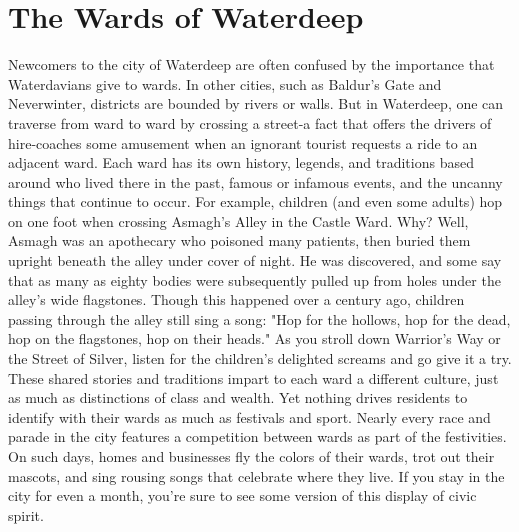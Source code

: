 \documentclass[10pt,a4paper,twoside,twocolumn,openany,nodeprecatedcode]{dndbook}
\begin{document}
\section{The Wards of Waterdeep}
Newcomers to the city of Waterdeep are often confused by the importance that Waterdavians give to wards. In other cities, such as Baldur's Gate and Neverwinter, districts are bounded by rivers or walls. But in Waterdeep, one can traverse from ward to ward by crossing a street-a fact that offers the drivers of hire-coaches some amusement when an ignorant tourist requests a ride to an adjacent ward.
Each ward has its own history, legends, and traditions based around who lived there in the past, famous or infamous events, and the uncanny things that continue to occur. For example, children (and even some adults) hop on one foot when crossing Asmagh's Alley in the Castle Ward. Why? Well, Asmagh was an apothecary who poisoned many patients, then buried them upright beneath the alley under cover of night. He was discovered, and some say that as many as eighty bodies were subsequently pulled up from holes under the alley's wide flagstones. Though this happened over a century ago, children passing through the alley still sing a song: "Hop for the hollows, hop for the dead, hop on the flagstones, hop on their heads." As you stroll down Warrior's Way or the Street of Silver, listen for the children's delighted screams and go give it a try.
These shared stories and traditions impart to each ward a different culture, just as much as distinctions of class and wealth. Yet nothing drives residents to identify with their wards as much as festivals and sport. Nearly every race and parade in the city features a competition between wards as part of the festivities. On such days, homes and businesses fly the colors of their wards, trot out their mascots, and sing rousing songs that celebrate where they live. If you stay in the city for even a month, you're sure to see some version of this display of civic spirit.
\end{document}
